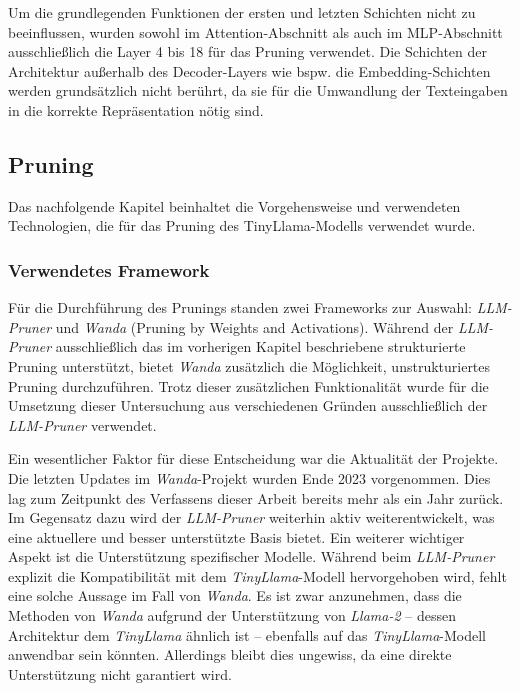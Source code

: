 Um die grundlegenden Funktionen der ersten und letzten Schichten nicht zu
beeinflussen, wurden sowohl im Attention-Abschnitt als auch im MLP-Abschnitt
ausschließlich die Layer 4 bis 18 für das Pruning verwendet. Die Schichten der
Architektur außerhalb des Decoder-Layers wie bspw. die Embedding-Schichten
werden grundsätzlich nicht berührt, da sie für die Umwandlung der Texteingaben
in die korrekte Repräsentation nötig sind.

\subsection{Pruning}

Das nachfolgende Kapitel beinhaltet die Vorgehensweise und verwendeten
Technologien, die für das Pruning des TinyLlama-Modells verwendet wurde.

\subsubsection{Verwendetes Framework}

Für die Durchführung des Prunings standen zwei Frameworks zur Auswahl:
\emph{LLM-Pruner} und \emph{Wanda} (Pruning by Weights and Activations). Während
der \emph{LLM-Pruner} ausschließlich das im vorherigen Kapitel beschriebene
strukturierte Pruning unterstützt, bietet \emph{Wanda} zusätzlich die
Möglichkeit, unstrukturiertes Pruning durchzuführen. Trotz dieser zusätzlichen
Funktionalität wurde für die Umsetzung dieser Untersuchung aus verschiedenen
Gründen ausschließlich der \emph{LLM-Pruner} verwendet.

Ein wesentlicher Faktor für diese Entscheidung war die Aktualität der Projekte.
Die letzten Updates im \emph{Wanda}-Projekt wurden Ende 2023 vorgenommen. Dies
lag zum Zeitpunkt des Verfassens dieser Arbeit bereits mehr als ein Jahr zurück.
Im Gegensatz dazu wird der \emph{LLM-Pruner} weiterhin aktiv weiterentwickelt,
was eine aktuellere und besser unterstützte Basis bietet. Ein weiterer wichtiger
Aspekt ist die Unterstützung spezifischer Modelle. Während beim
\emph{LLM-Pruner} explizit die Kompatibilität mit dem \emph{TinyLlama}-Modell
hervorgehoben wird, fehlt eine solche Aussage im Fall von \emph{Wanda}. Es ist
zwar anzunehmen, dass die Methoden von \emph{Wanda} aufgrund der Unterstützung
von \emph{Llama-2} – dessen Architektur dem \emph{TinyLlama} ähnlich ist –
ebenfalls auf das \emph{TinyLlama}-Modell anwendbar sein könnten. Allerdings
bleibt dies ungewiss, da eine direkte Unterstützung nicht garantiert wird.

